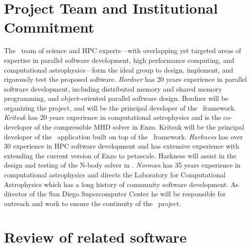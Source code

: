 \documentclass[11pt,letterpaper]{article}
\begin{document}

\section{Project Team and Institutional Commitment}

The \cello\ team of science and HPC experts---with overlapping yet targeted areas of expertise in
parallel software development, high performance computing, and
computational astrophysics---form the ideal group to design,
implement, and rigorously test the proposed software.
%
\textit{Bordner} has 20 years experience in parallel software development,
including distributed memory and shared memory programming, and object-oriented
parallel software design.
Bordner will be organizing the project, and will be the principal developer
of the \cello\ framework.
\textit{Kritsuk} has 20 years experience in computational astrophysics
and is the co-developer of the compressible MHD solver in Enzo. Kritsuk will be the principal
developer of the \enzoii\ application built on top of the \cello\ framework.
%
\textit{Harkness} has over 30 experience in HPC software development and
has extensive experience with extending the current version of Enzo to
petascale.  Harkness will assist in the design and testing of the
N-body solver in \enzoii.  
%
\textit{Norman} has 35 years experience in
computational astrophysics and directs the Laboratory for
Computational Astrophysics which has a long history of community
software development. As director of the San Diego Supercomputer
Center he will be responsible for outreach and work to ensure the
continuity of the \cello\ project.

%

\section{Review of related software} \label{s:review}
\end{document}
